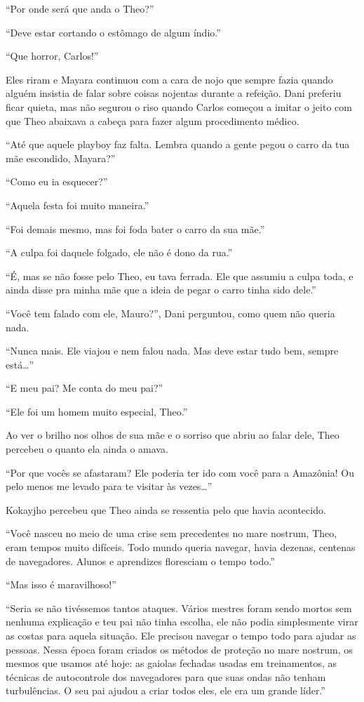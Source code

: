 ``Por onde será que anda o Theo?''

``Deve estar cortando o estômago de algum índio.''

``Que horror, Carlos!''

Eles riram e Mayara continuou com a cara de nojo que sempre fazia quando
alguém insistia de falar sobre coisas nojentas durante a refeição. Dani
preferiu ficar quieta, mas não segurou o riso quando Carlos começou a
imitar o jeito com que Theo abaixava a cabeça para fazer algum procedimento
médico.

``Até que aquele playboy faz falta. Lembra quando a gente pegou o carro
da tua mãe escondido, Mayara?''

``Como eu ia esquecer?''

``Aquela festa foi muito maneira.''

``Foi demais mesmo, mas foi foda bater o carro da sua mãe.''

``A culpa foi daquele folgado, ele não é dono da rua.''

``É, mas se não fosse pelo Theo, eu tava ferrada. Ele que assumiu a culpa
toda, e ainda disse pra minha mãe que a ideia de pegar o carro tinha
sido dele.''

``Você tem falado com ele, Mauro?'', Dani perguntou, como quem não queria
nada.

``Nunca mais. Ele viajou e nem falou nada. Mas deve estar tudo bem,
sempre está\ldots{}''

\asterisc


``E meu pai? Me conta do meu pai?''

``Ele foi um homem muito especial, Theo.''

Ao ver o brilho nos olhos de sua mãe e o sorriso que abriu ao falar
dele, Theo percebeu o quanto ela ainda o amava.

``Por que vocês se afastaram? Ele poderia ter ido com você para a
Amazônia! Ou pelo menos me levado para te visitar às vezes\ldots{}''

Kokayjho percebeu que Theo ainda se ressentia pelo que havia acontecido.

``Você nasceu no meio de uma crise sem precedentes no mare nostrum, Theo,
eram tempos muito difíceis. Todo mundo queria navegar, havia dezenas,
centenas de navegadores. Alunos e aprendizes floresciam o tempo todo.''

``Mas isso é maravilhoso!''

``Seria se não tivéssemos tantos ataques. Vários mestres foram sendo
mortos sem nenhuma explicação e teu pai não tinha escolha, ele não podia
simplesmente virar as costas para aquela situação. Ele precisou navegar
o tempo todo para ajudar as pessoas. Nessa época foram criados os
métodos de proteção no mare nostrum, os mesmos que usamos até hoje:
as gaiolas fechadas usadas em treinamentos, as técnicas de
autocontrole dos navegadores para que suas ondas não tenham
turbulências. O seu pai ajudou a criar todos eles, ele era um grande
líder.''

